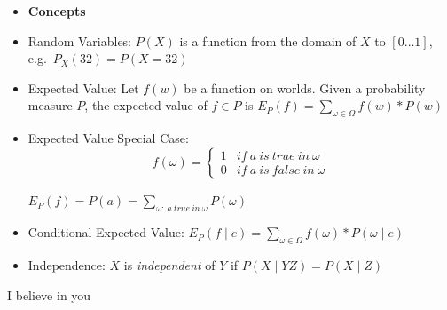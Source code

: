 \documentclass[11pt,landscape]{memoir}
\begin{document}
\begin{multicols}{2}
\begin{itemize}
    \item \textbf{Concepts}
    \item Random Variables: $P(X)$ is a function from the domain of $X$ to $[0 \ldots 1]$, e.g.\ $P_X(32) = P(X=32)$
    \item Expected Value: Let $f(w)$ be a function on worlds. Given a probability measure $P$, the expected value of $f \in P$ is $E_P(f) = \sum_{\omega \in \Omega} f(w) * P(w)$
    \item Expected Value Special Case: \\
        \[ f(\omega) =
        \begin{cases}
            1 & if\ a\ is\ true\ in\ \omega \\
            0 & if\ a\ is\ false\ in\ \omega
        \end{cases}
        \] \\
        $E_P(f) = P(a) = \sum_{\omega:\ a\ true\ in\ \omega} P(\omega)$
    \item Conditional Expected Value: $E_P(f \mid e) = \sum_{\omega \in \Omega} f(\omega) * P(\omega \mid e)$
    \item Independence: $X$ is \textit{independent} of $Y$ if $P(X \mid YZ) = P(X \mid Z)$
\end{itemize}


\end{multicols}

\tiny{I believe in you}
\end{document}
